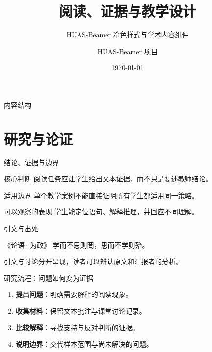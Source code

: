 \documentclass[aspectratio=169]{ctexbeamer}
\title{阅读、证据与教学设计}
\subtitle{HUAS-Beamer 冷色样式与学术内容组件}
\author{HUAS-Beamer 项目}
\institute{湖南文理学院}
\date{\today}
\begin{document}
\HUASmaketitle
\begin{frame}{内容结构}
  \tableofcontents[hideallsubsections]
\end{frame}
\section{研究与论证}
\begin{frame}{结论、证据与边界}
  \begin{block}{核心判断}
    阅读任务应让学生给出文本证据，而不只是复述教师结论。
  \end{block}
  \begin{alertblock}{适用边界}
    单个教学案例不能直接证明所有学生都适用同一策略。
  \end{alertblock}
  \begin{exampleblock}{可以观察的表现}
    学生能定位语句、解释推理，并回应不同理解。
  \end{exampleblock}
\end{frame}
\begin{frame}{引文与出处}
  \begin{HUASquotation}{《论语·为政》}
    学而不思则罔，思而不学则殆。
  \end{HUASquotation}
  \medskip
  引文与讨论分开呈现，读者可以辨认原文和汇报者的分析。
\end{frame}
\begin{frame}{研究流程：问题如何变为证据}
  \begin{enumerate}
    \item \textbf{提出问题}：明确需要解释的阅读现象。
    \item \textbf{收集材料}：保留文本批注与课堂讨论记录。
    \item \textbf{比较解释}：寻找支持与反对判断的证据。
    \item \textbf{说明边界}：交代样本范围与尚未解决的问题。
  \end{enumerate}
\end{frame}
\end{document}
